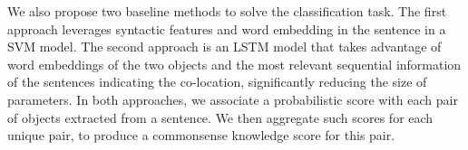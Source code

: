 %
%
%


We also propose two baseline methods to solve the classification task.
The first approach leverages syntactic features and word embedding
in the sentence in a SVM model. The second approach is an LSTM
model that takes advantage of word embeddings of the 
two objects and the most relevant sequential information of the sentences 
indicating the co-location, significantly reducing the size of 
parameters. In both approaches,
we associate a probabilistic score with each pair of objects extracted
from a sentence. We then aggregate such scores for each unique pair,
to produce a commonsense knowledge score for this pair.  

